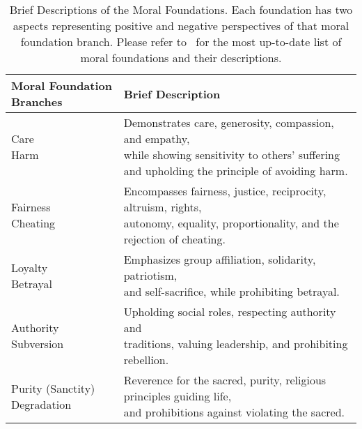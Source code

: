 \begin{table*}[t]
\small
\centering  
\begin{tabular}{|l|l|}
\toprule
Moral Foundation Branches & Brief Description \\
\midrule
\makecell{Care\\Harm} & \makecell{Demonstrates care, generosity, compassion, and empathy, \\while showing sensitivity to others’ suffering and upholding the principle of avoiding harm.}\\ 
\midrule
\makecell{Fairness\\Cheating} & \makecell{Encompasses fairness, justice, reciprocity, altruism, rights, \\autonomy, equality, proportionality, and the rejection of cheating.} \\
\midrule
\makecell{Loyalty\\Betrayal} & \makecell{Emphasizes group affiliation, solidarity, patriotism, \\and self-sacrifice, while prohibiting betrayal.} \\
\midrule
\makecell{Authority\\Subversion}& \makecell{Upholding social roles, respecting authority and \\traditions, valuing leadership, and prohibiting rebellion.} \\
\midrule
\makecell{Purity (Sanctity)\\Degradation} & \makecell{Reverence for the sacred, purity, religious principles guiding life, \\and prohibitions against violating the sacred.} \\
\bottomrule
\end{tabular}

\caption{Brief Descriptions of the Moral Foundations. Each foundation has two aspects representing positive and negative perspectives of that moral foundation branch. Please refer to~\citet{atari2023morality} for the most up-to-date list of moral foundations and their descriptions.} 
\label{appendix:MFs}
\end{table*}